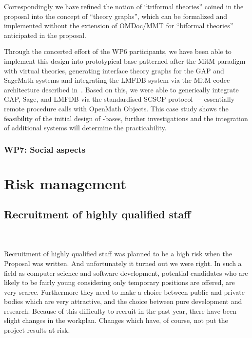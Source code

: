 \documentclass{deliverablereport}
\begin{document}
Correspondingly we have refined the notion of ``triformal theories'' coined in the
proposal into the concept of ``\DKS theory graphs'', which can be formalized and
implemented without the extension of OMDoc/MMT for ``biformal theories'' anticipated in
the proposal.

Through the concerted effort of the WP6 participants, we have been able to implement
this design into prototypical \DKS base patterned after the MitM paradigm with virtual
theories, generating interface theory graphs for the GAP and SageMath systems and
integrating the LMFDB system via the MitM codec architecture described
in~\cite{ODK-D6.2}. Based on this, we were able to generically integrate GAP, Sage, and
LMFDB via the standardised SCSCP protocol~\cite{HorRoz:ossp09} -- essentially remote
procedure calls with OpenMath Objects. This case study shows the feasibility of the
initial design of \DKS-bases, further investigations and the integration of additional
systems will determine the practicability.

\subsubsection{WP7: Social aspects}


\section{Risk management}
\subsection{Recruitment of highly qualified staff}
 ~\\~\\Recruitment of highly qualified staff was planned to be a high risk when the Proposal was written. And unfortunately it turned out we were right. In such a field as computer science and software development, potential candidates who are likely to be fairly young considering only temporary positions are offered, are very scarce. Furthermore they need to make a choice between public and private bodies which are very attractive, and the choice between pure development and research.
Because of this difficulty to recruit in the past year, there have been slight changes in the workplan. Changes which have, of course, not put the project results at risk.
\end{document}
